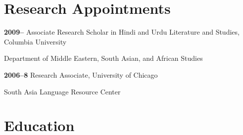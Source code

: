 \documentclass[letterpaper,12pt]{article}
\newenvironment{DUlineblock}[1]{%
    \list{}{\setlength{\partopsep}{\parskip}
            \addtolength{\partopsep}{\baselineskip}
            \setlength{\topsep}{0pt}
            \setlength{\itemsep}{0.15\baselineskip}
            \setlength{\parsep}{0pt}
            \setlength{\leftmargin}{#1}}
    \raggedright
  }
  {\endlist}
\begin{document}
\section{Research Appointments%
  \label{research-appointments}%
}

\begin{DUlineblock}{0em}
\item[] \textbf{2009–}
Associate Research Scholar in Hindi and Urdu Literature and Studies, Columbia University
\item[]
\begin{DUlineblock}{\DUlineblockindent}
\item[] Department of Middle Eastern, South Asian, and African Studies
\end{DUlineblock}
\item[] \textbf{2006–8}
Research Associate, University of Chicago
\item[]
\begin{DUlineblock}{\DUlineblockindent}
\item[] South Asia Language Resource Center
\end{DUlineblock}
\end{DUlineblock}


\section{Education%
  \label{education}%
}
\end{document}
